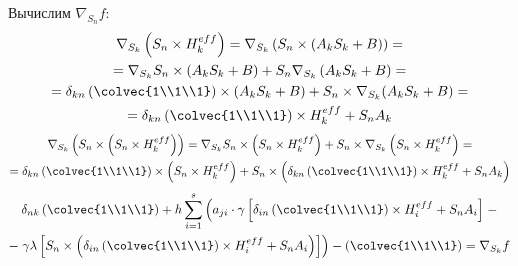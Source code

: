 Вычислим $\nabla_{S_n} f$:
\begin{multline*}
    \nabla_{S_k} \left(S_n \times H^{eff}_{k}\right) =
    \nabla_{S_k} \left(S_n \times\left(A_kS_k+B\right)\right) =\\=
    \nabla_{S_k} S_n \times \left( A_kS_k + B\right) + S_n\nabla_{S_k}
    \left(A_kS_k+B\right) =\\=
    \delta_{kn} \left(\colvec{1\\1\\1}\right) \times (A_kS_k+B) +
    S_n\times\nabla_{S_k}(A_kS_k+B) =\\=
    \delta_{kn} \left(\colvec{1\\1\\1}\right) \times H^{eff}_k + S_n A_k
\end{multline*}
\begin{multline*}
    \nabla_{S_k}\left(S_n\times\left(S_n\times H_k^{eff}\right)\right) =
    \nabla_{S_k}S_n\times\left(S_n\times H^{eff}_k\right) +
    S_n\times \nabla_{S_k}\left(S_n\times H^{eff}_k\right) =\\=
    \delta_{kn}\left(\colvec{1\\1\\1}\right)\times\left(S_n \times
    H^{eff}_k\right) +
    S_n\times \left(\delta_{kn}\left(\colvec{1\\1\\1}\right)\times H^{eff}_k +
    S_nA_k\right)
\end{multline*}
\begin{multline}
    \delta_{nk}\left(\colvec{1\\1\\1}\right) + h\sum_{i=1}^s \left( a_{ji}\cdot
     \gamma\left[
            \delta_{in} \left(\colvec{1\\1\\1}\right) \times H^{eff}_i + S_n
        A_i  \right] \right. -\\- \left. \gamma\lambda \left[
    S_n\times \left(\delta_{in}\left(\colvec{1\\1\\1}\right)\times H^{eff}_i +
S_nA_i\right) \right] \right) - \left(\colvec{1\\1\\1}\right) =
\nabla_{S_k}f
\end{multline}
